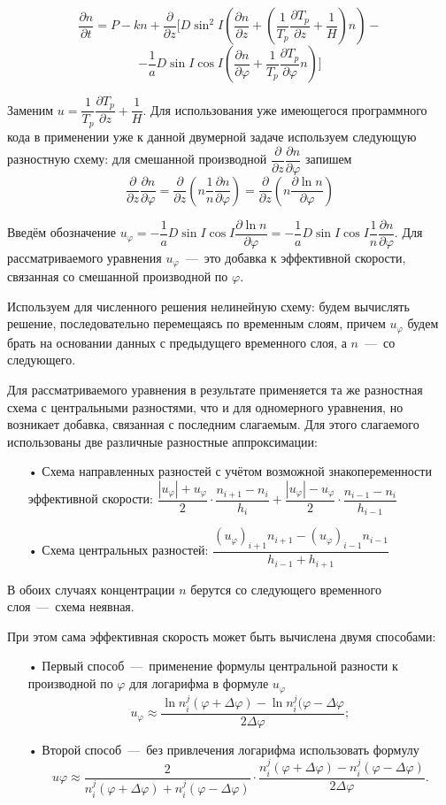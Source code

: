 \documentclass[14pt, a4paper, fleqn, twoside]{extreport}
\begin{document}
$$\dfrac{\partial n}{\partial t} =P-kn+\dfrac{\partial}{\partial z}\biggl[D\sin^2 I\left(\dfrac{\partial n}{\partial z}+\left(\dfrac{1}{T_p}\dfrac{\partial T_p}{\partial z}+\dfrac{1}{H}\right)n\right)-$$ $$-\dfrac{1}{a}D\sin I\cos I\left(\dfrac{\partial n}{\partial\varphi}+\dfrac{1}{T_p}\dfrac{\partial T_p}{\partial\varphi}n\right)\biggr]$$

Заменим $u = \dfrac{1}{T_p}\dfrac{\partial T_p}{\partial z}+\dfrac{1}{H}$. Для использования уже имеющегося программного кода в применении уже к данной двумерной задаче используем следующую разностную схему: для смешанной производной $\dfrac{\partial}{\partial z}\dfrac{\partial n}{\partial \varphi}$ запишем $$\dfrac{\partial}{\partial z}\dfrac{\partial n}{\partial \varphi}=\dfrac{\partial}{\partial z}\left(n\dfrac{1}{n}\dfrac{\partial n}{\partial \varphi}\right) = \dfrac{\partial}{\partial z}\left(n\dfrac{\partial \ln n}{\partial \varphi}\right)$$

Введём обозначение $u_\varphi=-\dfrac{1}{a}D\sin I \cos I\dfrac{\partial \ln n}{\partial \varphi}=-\dfrac{1}{a}D\sin I \cos I\dfrac{1}{n}\dfrac{\partial n}{\partial \varphi}.$ Для рассматриваемого уравнения $u_\varphi$~---~это добавка к эффективной скорости, связанная со смешанной производной по $\varphi$.

Используем для численного решения нелинейную схему: будем вычислять решение, последовательно перемещаясь по временным слоям, причем $u_\varphi$ будем брать на основании данных с предыдущего временного слоя, а $n$~---~со следующего.

Для рассматриваемого уравнения в результате применяется та же разностная схема с центральными разностями, что и для одномерного уравнения, но возникает добавка, связанная с последним слагаемым. Для этого слагаемого использованы две различные разностные аппроксимации:
\begin{itemize}
\item[•] Схема направленных разностей с учётом возможной знакопеременности эффективной скорости: $\dfrac{|u_\varphi|+u_\varphi}{2}\cdot\dfrac{n_{i+1}-n_i}{h_i} + \dfrac{|u_\varphi|-u_\varphi}{2}\cdot\dfrac{n_{i-1}-n_i}{h_{i-1}}$
\item[•] Схема центральных разностей: $\dfrac{(u_\varphi)_{i+1}n_{i+1}-(u_\varphi)_{i-1}n_{i-1}}{h_{i-1}+h_{i+1}}$
\end{itemize}
В обоих случаях концентрации $n$ берутся со следующего временного слоя~---~схема неявная.

\smallskip

При этом сама эффективная скорость может быть вычислена двумя способами: 
\begin{itemize}
\item[•] Первый способ~---~применение формулы центральной разности к производной по $\varphi$ для логарифма в формуле $u_\varphi$ $$u_\varphi\approx \dfrac{\ln n^j_i(\varphi+\Delta\varphi)-\ln n^j_i(\varphi-\Delta\varphi}{2\Delta\varphi};$$ 
\item[•] Второй способ~---~без привлечения логарифма использовать формулу $$u\varphi \approx \dfrac{2}{n_i^j(\varphi+\Delta\varphi)+n_i^j(\varphi-\Delta\varphi)}\cdot\dfrac{n_i^j(\varphi+\Delta\varphi)-n_i^j(\varphi-\Delta\varphi)}{2\Delta\varphi}.$$
\end{itemize}
\end{document}
